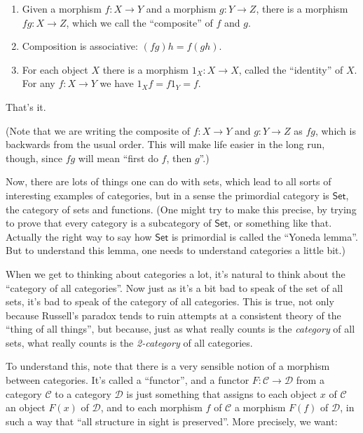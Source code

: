 \documentclass{article}
\begin{document}
\begin{enumerate}
\def\labelenumi{\arabic{enumi})}
\item
  Given a morphism \(f\colon X \to Y\) and a morphism
  \(g\colon Y \to Z\), there is a morphism \(fg\colon X \to Z\), which
  we call the ``composite'' of \(f\) and \(g\).
\item
  Composition is associative: \((fg)h = f(gh)\).
\item
  For each object \(X\) there is a morphism \(1_X\colon X \to X\),
  called the ``identity'' of \(X\). For any \(f\colon X \to Y\) we have
  \(1_X f = f 1_Y = f\).
\end{enumerate}

That's it.

(Note that we are writing the composite of \(f\colon X \to Y\) and
\(g\colon Y \to Z\) as \(fg\), which is backwards from the usual order.
This will make life easier in the long run, though, since \(fg\) will
mean ``first do \(f\), then \(g\)''.)

Now, there are lots of things one can do with sets, which lead to all
sorts of interesting examples of categories, but in a sense the
primordial category is \(\mathsf{Set}\), the category of sets and
functions. (One might try to make this precise, by trying to prove that
every category is a subcategory of \(\mathsf{Set}\), or something like
that. Actually the right way to say how \(\mathsf{Set}\) is primordial
is called the ``Yoneda lemma''. But to understand this lemma, one needs
to understand categories a little bit.)

When we get to thinking about categories a lot, it's natural to think
about the ``category of all categories''. Now just as it's a bit bad to
speak of the set of all sets, it's bad to speak of the category of all
categories. This is true, not only because Russell's paradox tends to
ruin attempts at a consistent theory of the ``thing of all things'', but
because, just as what really counts is the \emph{category} of all sets,
what really counts is the \emph{2-category} of all categories.

To understand this, note that there is a very sensible notion of a
morphism between categories. It's called a ``functor'', and a functor
\(F\colon \mathcal{C} \to \mathcal{D}\) from a category \(\mathcal{C}\)
to a category \(\mathcal{D}\) is just something that assigns to each
object \(x\) of \(\mathcal{C}\) an object \(F(x)\) of \(\mathcal{D}\),
and to each morphism \(f\) of \(\mathcal{C}\) a morphism \(F(f)\) of
\(\mathcal{D}\), in such a way that ``all structure in sight is
preserved''. More precisely, we want:
\end{document}
